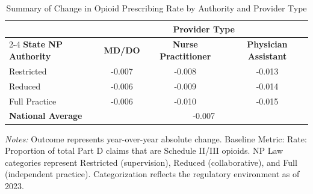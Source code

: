 \begin{table}[htbp]
    \centering
    \caption{Summary of Change in Opioid Prescribing Rate by Authority and Provider Type}
    \label{tab:d_partd_opioid_rate}
    \vspace{0.2cm}
    \begin{tabular}{lccc}
        \toprule
        & \multicolumn{3}{c}{\textbf{Provider Type}} \\
        \cmidrule(lr){2-4}
        \textbf{State NP Authority} & \textbf{MD/DO} & \textbf{Nurse Practitioner} & \textbf{Physician Assistant} \\
        \midrule
        Restricted & -0.007 & -0.008 & -0.013 \\
        Reduced & -0.006 & -0.009 & -0.014 \\
        Full Practice & -0.006 & -0.010 & -0.015 \\
        \midrule
        \textbf{National Average} & \multicolumn{3}{c}{-0.007} \\
        \bottomrule
    \end{tabular}
    \vspace{0.1cm}
    \begin{minipage}{0.85\textwidth}
        \footnotesize \textit{Notes:} Outcome represents year-over-year absolute change. Baseline Metric: Rate: Proportion of total Part D claims that are Schedule II/III opioids. NP Law categories represent Restricted (supervision), Reduced (collaborative), and Full (independent practice). Categorization reflects the regulatory environment as of 2023.
    \end{minipage}
\end{table}